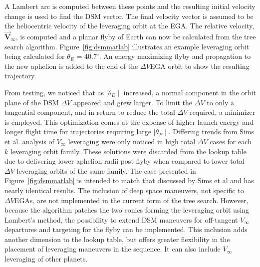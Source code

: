 \documentclass[letterpaper, paper,11pt]{AAS}	%
\begin{document}
A Lambert arc is computed between these points and the resulting initial velocity change is used to find the DSM vector. The final velocity vector is assumed to be the heliocentric velocity of the leveraging orbit at the EGA. The relative velocity, $\vec{\textbf{V}}_{\infty}$, is computed and a planar flyby of Earth can now be calculated from the tree search algorithm. Figure~\ref{fig:dsmmatlab} illustrates an example leveraging orbit being calculated for $\theta_{E}$ = 40.$7^{\circ}$. An energy maximizing flyby and propagation to the new aphelion is added to the end of the $\Delta V$EGA orbit to show the resulting trajectory.

From testing, we noticed that as $\mid\theta_E\mid$ increased, a normal component in the orbit plane of the DSM $\Delta V$ appeared and grew larger. To limit the $\Delta V$ to only a tangential component, and in return to reduce the total $\Delta V$ required, a minimizer is employed. This optimization comes at the expense of higher launch energy and longer flight time for trajectories requiring large $\mid\theta_E\mid$. Differing trends from Sims et al. analysis of $V_\infty$ leveraging\cite{sims1994} were only noticed in high total $\Delta V$ cases for each $k$ leveraging orbit family. These solutions were discarded from the lookup table due to delivering lower aphelion radii post-flyby when compared to lower total $\Delta V$ leveraging orbits of the same family. The case presented in Figure~\ref{fig:dsmmatlab} is intended to match that discussed by Sims et al\cite{Sims1997} and has nearly identical results. The inclusion of deep space maneuvers, not specific to $\Delta V$EGAs, are not implemented in the current form of the tree search. However, because the algorithm patches the two conics forming the leveraging orbit using Lambert's method, the possibility to extend DSM maneuvers for off-tangent $V_\infty$ departures and targeting for the flyby can be implemented. This inclusion adds another dimension to the lookup table, but offers greater flexibility in the placement of  leveraging maneuvers in the sequence. It can also include $V_\infty$ leveraging of other planets.
\end{document}
